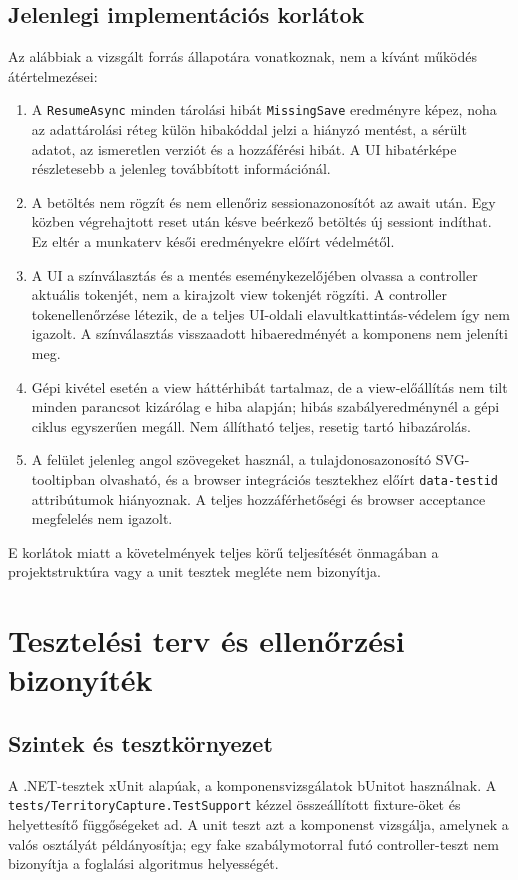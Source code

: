 \documentclass[11pt,a4paper]{article}
\newcommand{\code}[1]{\nolinkurl{#1}}
\begin{document}
\subsection{Jelenlegi implementációs korlátok}\label{sec:limits}
Az alábbiak a vizsgált forrás állapotára vonatkoznak, nem a kívánt működés átértelmezései:
\begin{enumerate}
\item A \code{ResumeAsync} minden tárolási hibát \code{MissingSave} eredményre képez, noha az adattárolási réteg külön hibakóddal jelzi a hiányzó mentést, a sérült adatot, az ismeretlen verziót és a hozzáférési hibát. A UI hibatérképe részletesebb a jelenleg továbbított információnál.
\item A betöltés nem rögzít és nem ellenőriz sessionazonosítót az await után. Egy közben végrehajtott reset után késve beérkező betöltés új sessiont indíthat. Ez eltér a munkaterv késői eredményekre előírt védelmétől.
\item A UI a színválasztás és a mentés eseménykezelőjében olvassa a controller aktuális tokenjét, nem a kirajzolt view tokenjét rögzíti. A controller tokenellenőrzése létezik, de a teljes UI-oldali elavultkattintás-védelem így nem igazolt. A színválasztás visszaadott hibaeredményét a komponens nem jeleníti meg.
\item Gépi kivétel esetén a view háttérhibát tartalmaz, de a view-előállítás nem tilt minden parancsot kizárólag e hiba alapján; hibás szabályeredménynél a gépi ciklus egyszerűen megáll. Nem állítható teljes, resetig tartó hibazárolás.
\item A felület jelenleg angol szövegeket használ, a tulajdonosazonosító SVG-tooltipban olvasható, és a browser integrációs tesztekhez előírt \code{data-testid} attribútumok hiányoznak. A teljes hozzáférhetőségi és browser acceptance megfelelés nem igazolt.
\end{enumerate}
E korlátok miatt a követelmények teljes körű teljesítését önmagában a projektstruktúra vagy a unit tesztek megléte nem bizonyítja.

\section{Tesztelési terv és ellenőrzési bizonyíték}
\subsection{Szintek és tesztkörnyezet}
A .NET-tesztek xUnit alapúak, a komponensvizsgálatok bUnitot használnak. A \code{tests/TerritoryCapture.TestSupport} kézzel összeállított fixture-öket és helyettesítő függőségeket ad. A unit teszt azt a komponenst vizsgálja, amelynek a valós osztályát példányosítja; egy fake szabálymotorral futó controller-teszt nem bizonyítja a foglalási algoritmus helyességét.
\end{document}
